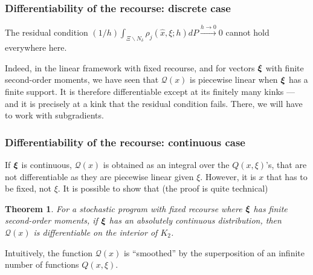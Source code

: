 \documentclass[aspectratio=169]{beamer}
\newtheorem{theo}{Theorem}
\begin{document}
\begin{frame}
\frametitle{Differentiability of the recourse: discrete case}

The residual condition $(1/h) \int_{\Xi
  \backslash N_{\delta}} \rho_j (\hat{x}, \xi; h) dP \overset{h
  \rightarrow 0}{\rightarrow } 0$ {\red cannot hold everywhere} here.

\mbox{}

Indeed, in the linear framework with fixed recourse, and for vectors ${\boldsymbol{\xi}}$ with finite second-order moments, we have seen that $\mathcal{Q}(x)$ is piecewise linear when ${\boldsymbol{\xi}}$ has a finite support.
It is therefore differentiable {\red except} at its finitely many kinks --- and it is precisely at a kink that the residual condition fails.
There, we will have to work with subgradients.

\end{frame}

\begin{frame}
\frametitle{Differentiability of the recourse: continuous case}

If ${\boldsymbol{\xi}}$ is continuous, $\mathcal{Q}(x)$ is obtained as an integral over the $Q(x,\xi)$'s, that are not differentiable as they are piecewise linear given $\xi$.
However, it is $x$ that has to be fixed, not $\xi$.
It is possible to show that (the proof is quite technical)

\mbox{}

\begin{theo}
For a stochastic program with fixed recourse where ${\boldsymbol{\xi}}$ has finite second-order moments, if ${\boldsymbol{\xi}}$ has an absolutely continuous distribution, then $\mathcal{Q}(x)$ is differentiable on the interior of $K_2$.
\end{theo}

\mbox{}

Intuitively, the function $\mathcal{Q}(x)$ is ``smoothed'' by the superposition of an infinite number of functions $Q(x,\xi)$.

\end{frame}
\end{document}
